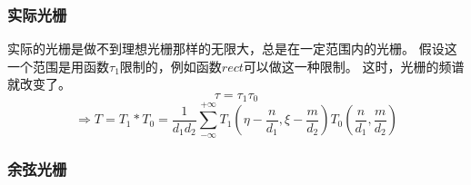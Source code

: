 \documentclass{article}
\begin{document}
\subsubsection{实际光栅}
实际的光栅是做不到理想光栅那样的无限大，总是在一定范围内的光栅。
假设这一个范围是用函数$\tau_1$限制的，例如函数$rect$可以做这一种限制。
这时，光栅的频谱就改变了。
\[\tau=\tau_1\tau_0\]
\[\Rightarrow T=T_1*T_0=\frac{1}{d_1d_2}\sum_{-\infty}^{+\infty}T_1(\eta-\frac{n}{d_1},\xi-\frac{m}{d_2})T_0(\frac{n}{d_1},\frac{m}{d_2})\]

\subsubsection{余弦光栅}
\end{document}
